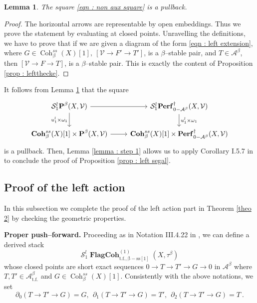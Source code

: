\documentclass[11pt]{article}
\newtheorem{lemma}[theorem]{Lemma}
\newcommand{\segal}{\mathcal{S}}
\newcommand{\abeta}{\mathcal{A}^{\beta}}
\newcommand{\abetatf}{\mathcal{A}^{\beta}_{\operatorname{t.f.}}}
\newcommand{\cohbetass}{\operatorname{Coh}^{ss}_{\beta}(X)}
\newcommand{\cohbetassstack}{\boldsymbol{\operatorname{Coh}}^{ss}_{\beta}(X)}
\newcommand{\framing}{\mathcal{V}}
\newcommand{\pairs}{\boldsymbol{\operatorname{P}}^{\beta}(X,\mathcal{V})}
\begin{document}
\begin{lemma}\label{lemma : step 2}
    The square \eqref{eqn : non aux square} is a pullback.
\end{lemma}
\begin{proof}
    The horizontal arrows are representable by open embeddings. Thus we prove the statement by evaluating at closed points. Unravelling the definitions, we have to prove that if we are given a diagram of the form \eqref{eqn : left extension}, where $G \in \cohbetass[1],  \ [\framing \rightarrow F' \rightarrow T']$, is a $\beta$--stable pair, and $T\in \abeta$, then  $[\framing \rightarrow F \rightarrow T]$, is a $\beta$--stable pair. This is exactly the content of Proposition \ref{prop : leftthecke}.
\end{proof}
\noindent It follows from Lemma \ref{lemma : step 2} that the square 
\begin{equation*}
\begin{tikzcd}
{\segal_1^l\pairs} & {\segal_1^l\boldsymbol{\operatorname{Perf}}^{\dagger}_{0-\abeta}(X,\framing)} \\
	{\cohbetassstack[1] \times \pairs} & {\cohbetassstack[1] \times \boldsymbol{\operatorname{Perf}}^{\dagger}_{0-\abeta}(X,\framing)}
	\arrow[from=1-1, to=1-2]
	\arrow["{u_1^l \times \omega_1}"', from=1-1, to=2-1]
	\arrow["{u_1^l \times \omega_1}", from=1-2, to=2-2]
	\arrow[from=2-1, to=2-2]
\end{tikzcd}
\end{equation*}
is a pullback. Then, Lemma \ref{lemma : step 1} allows us to apply Corollary I.5.7 in \cite{dps} to conclude the proof of Proposition \ref{prop : left segal}.



\subsection{Proof of the left action}
In this subsection we complete the proof of the left action part in Theorem \ref{theo 2} by checking the geometric properties.
\medskip 

\noindent \textbf{Proper push--forward. }Proceeding as in Notation III.4.22 in \cite{dps}, we can define a derived stack $$\segal_1^l\boldsymbol{\operatorname{FlagCoh}}^{(1)}_{\operatorname{t.f.,\beta-ss[1]}}(X,\tau^\beta)$$
    whose closed points are short exact sequences $0 \rightarrow T\rightarrow T'\rightarrow G \rightarrow 0$ in $\abeta$ where $T, T'\in \abetatf$ and $G\in \cohbetass[1]$. Consistently with the above notations, we set
    \[
        \partial_0(T\rightarrow T'\rightarrow G)=G,\ \  \partial_1(T\rightarrow T'\rightarrow G)=T', \ \ \partial_2(T\rightarrow T'\rightarrow G)=T \ .
    \]
\end{document}
